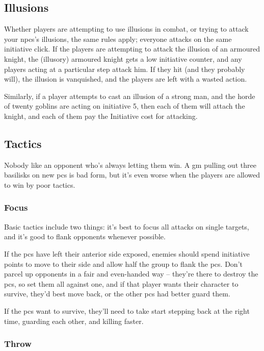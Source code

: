 \begin{multicols}{2}
\subsection{Illusions}

Whether players are attempting to use illusions in combat, or trying to attack your \glspl{npc}'s illusions, the same rules apply; everyone attacks on the same initiative click.
If the players are attempting to attack the illusion of an armoured knight, the (illusory) armoured knight gets a low initiative counter, and any players acting at a particular step attack him.
If they hit (and they probably will), the illusion is vanquished, and the players are left with a wasted action.

Similarly, if a player attempts to cast an illusion of a strong man, and the horde of twenty goblins are acting on initiative 5, then each of them will attach the knight, and each of them pay the Initiative cost for attacking.

\subsection{Tactics}

Nobody like an opponent who's always letting them win.
A \gls{gm} pulling out three basilisks on new \glspl{pc} is bad form, but it's even worse when the players are allowed to win by poor tactics.

\subsubsection{Focus}

Basic tactics include two things: it's best to focus all attacks on single targets, and it's good to flank opponents whenever possible.

If the \glspl{pc} have left their anterior side exposed, enemies should spend initiative points to move to their side and allow half the group to flank the \glspl{pc}.
Don't parcel up opponents in a fair and even-handed way -- they're there to destroy the \glspl{pc}, so set them all against one, and if that player wants their character to survive, they'd best move back, or the other \glspl{pc} had better guard them.

If the \glspl{pc} want to survive, they'll need to take start stepping back at the right time, guarding each other, and killing faster.

\subsubsection{Throw}


\end{multicols}
